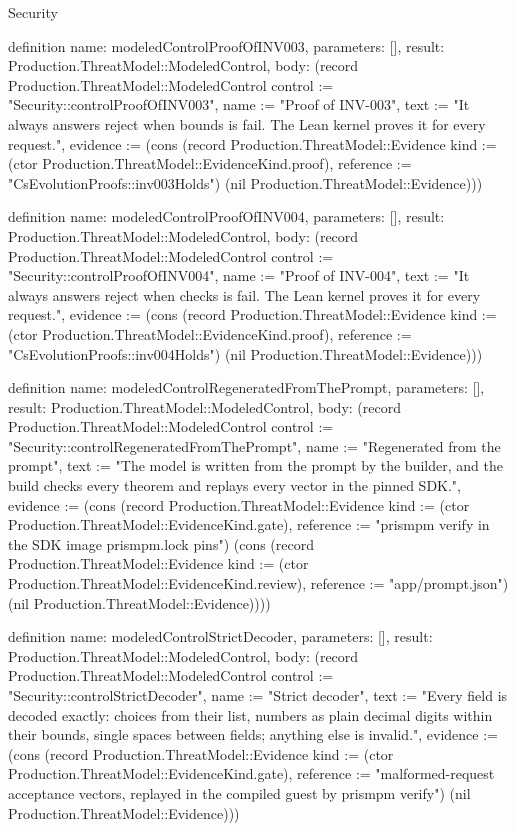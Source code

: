 \begin{lexlean}{Security}
\begin{semanticmodule}
definition{
  name: modeledControlProofOfINV003,
  parameters: [],
  result: Production.ThreatModel::ModeledControl,
  body: (record Production.ThreatModel::ModeledControl {control := "Security::controlProofOfINV003", name := "Proof of INV-003", text := "It always answers reject when bounds is fail. The Lean kernel proves it for every request.", evidence := (cons (record Production.ThreatModel::Evidence {kind := (ctor Production.ThreatModel::EvidenceKind.proof), reference := "CsEvolutionProofs::inv003Holds"}) (nil Production.ThreatModel::Evidence))})
}

definition{
  name: modeledControlProofOfINV004,
  parameters: [],
  result: Production.ThreatModel::ModeledControl,
  body: (record Production.ThreatModel::ModeledControl {control := "Security::controlProofOfINV004", name := "Proof of INV-004", text := "It always answers reject when checks is fail. The Lean kernel proves it for every request.", evidence := (cons (record Production.ThreatModel::Evidence {kind := (ctor Production.ThreatModel::EvidenceKind.proof), reference := "CsEvolutionProofs::inv004Holds"}) (nil Production.ThreatModel::Evidence))})
}

definition{
  name: modeledControlRegeneratedFromThePrompt,
  parameters: [],
  result: Production.ThreatModel::ModeledControl,
  body: (record Production.ThreatModel::ModeledControl {control := "Security::controlRegeneratedFromThePrompt", name := "Regenerated from the prompt", text := "The model is written from the prompt by the builder, and the build checks every theorem and replays every vector in the pinned SDK.", evidence := (cons (record Production.ThreatModel::Evidence {kind := (ctor Production.ThreatModel::EvidenceKind.gate), reference := "prismpm verify in the SDK image prismpm.lock pins"}) (cons (record Production.ThreatModel::Evidence {kind := (ctor Production.ThreatModel::EvidenceKind.review), reference := "app/prompt.json"}) (nil Production.ThreatModel::Evidence)))})
}

definition{
  name: modeledControlStrictDecoder,
  parameters: [],
  result: Production.ThreatModel::ModeledControl,
  body: (record Production.ThreatModel::ModeledControl {control := "Security::controlStrictDecoder", name := "Strict decoder", text := "Every field is decoded exactly: choices from their list, numbers as plain decimal digits within their bounds, single spaces between fields; anything else is invalid.", evidence := (cons (record Production.ThreatModel::Evidence {kind := (ctor Production.ThreatModel::EvidenceKind.gate), reference := "malformed-request acceptance vectors, replayed in the compiled guest by prismpm verify"}) (nil Production.ThreatModel::Evidence))})
}


\end{semanticmodule}
\end{lexlean}
